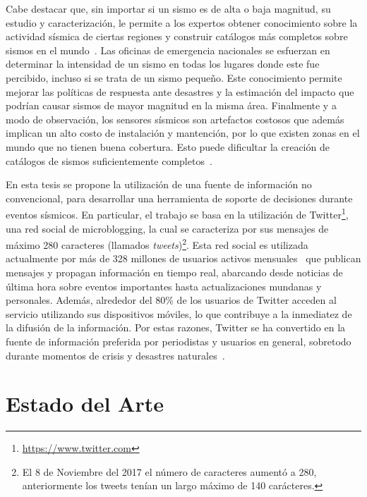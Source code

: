 Cabe destacar que, sin importar si un sismo es de alta o baja magnitud, su estudio y caracterización, le permite a los expertos obtener conocimiento sobre la actividad sísmica de ciertas regiones y construir catálogos más completos sobre sismos en el mundo~\cite{stein2009introduction}.
%
Las oficinas de emergencia nacionales se esfuerzan en determinar la intensidad de un sismo en todas los lugares donde este fue percibido, incluso si se trata de un sismo pequeño. 
%
Este conocimiento permite mejorar las políticas de respuesta ante desastres y la estimación del impacto que podrían causar sismos de mayor magnitud en la misma área.
%
Finalmente y a modo de observación, los sensores sísmicos son artefactos costosos que además implican un alto costo de instalación y mantención, por lo que existen zonas en el mundo que no tienen buena cobertura. Esto puede dificultar la creación de catálogos de sismos suficientemente completos~\cite{usgs,shoa,onemi,wyss2009delay}.


En esta tesis se propone la utilización de una fuente de información no convencional, para desarrollar una herramienta de soporte de decisiones durante eventos sísmicos.
%
En particular, el trabajo se basa en la utilización de Twitter\footnote{\url{https://www.twitter.com}}, una red social de microblogging, la cual se caracteriza por sus mensajes de máximo 280 caracteres (llamados {\em tweets})\footnote{El 8 de Noviembre del 2017 el número de caracteres aumentó a 280, anteriormente los tweets tenían un largo máximo de 140 carácteres.}.
%
Esta red social es utilizada actualmente por más de 328 millones de usuarios activos mensuales~\cite{abouttwitter} que publican mensajes y propagan información en tiempo real, abarcando desde noticias de última hora sobre eventos importantes hasta actualizaciones mundanas y personales.
%
Además, alrededor del 80\% de los usuarios de Twitter acceden al servicio utilizando sus dispositivos móviles, lo que contribuye a la inmediatez de la difusión de la información. 
%
Por estas razones, Twitter se ha convertido en la fuente de información preferida por periodistas y usuarios en general, sobretodo durante momentos de crisis y desastres naturales~\cite{castillo2016bcd,Mendoza:2010:TUC:1964858.1964869}.


\section{Estado del Arte}

